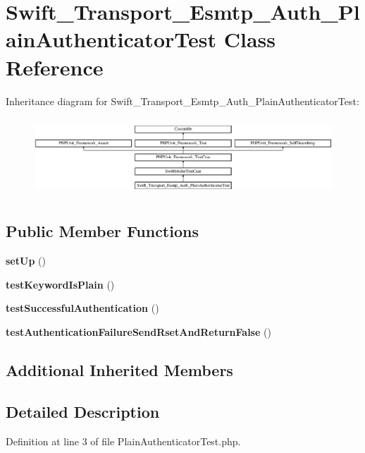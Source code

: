 \section{Swift\+\_\+\+Transport\+\_\+\+Esmtp\+\_\+\+Auth\+\_\+\+Plain\+Authenticator\+Test Class Reference}
\label{class_swift___transport___esmtp___auth___plain_authenticator_test}
Inheritance diagram for Swift\+\_\+\+Transport\+\_\+\+Esmtp\+\_\+\+Auth\+\_\+\+Plain\+Authenticator\+Test\+:\begin{figure}[H]
\begin{center}
\leavevmode
\includegraphics[height=2.972399cm]{class_swift___transport___esmtp___auth___plain_authenticator_test}
\end{center}
\end{figure}
\subsection*{Public Member Functions}
\begin{DoxyCompactItemize}
\item 
{\bf set\+Up} ()
\item 
{\bf test\+Keyword\+Is\+Plain} ()
\item 
{\bf test\+Successful\+Authentication} ()
\item 
{\bf test\+Authentication\+Failure\+Send\+Rset\+And\+Return\+False} ()
\end{DoxyCompactItemize}
\subsection*{Additional Inherited Members}


\subsection{Detailed Description}


Definition at line 3 of file Plain\+Authenticator\+Test.\+php.




